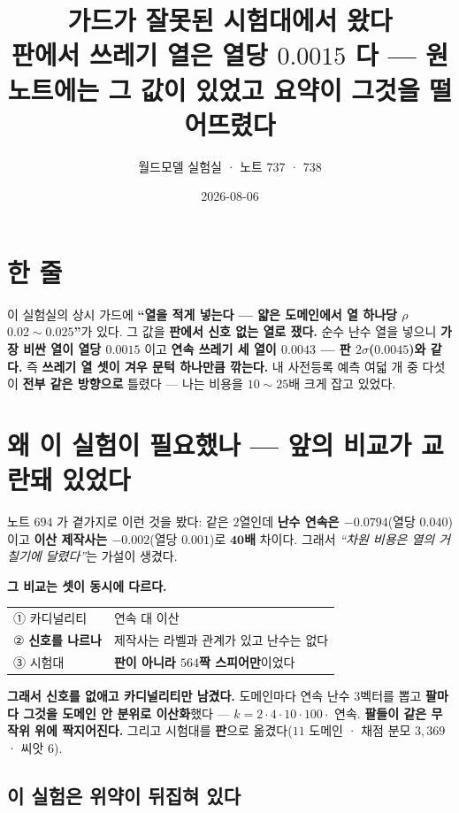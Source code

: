 \documentclass[10pt,a4paper]{article}
\title{\bfseries 가드가 잘못된 시험대에서 왔다\\[2pt]
\large 판에서 쓰레기 열은 열당 $0.0015$ 다 --- 원노트에는 그 값이 있었고 요약이 그것을 떨어뜨렸다}
\author{월드모델 실험실 · 노트 737 · 738}
\date{2026-08-06}
\begin{document}
\maketitle

\section{한 줄}

이 실험실의 상시 가드에 \textbf{``열을 적게 넣는다 --- 얇은 도메인에서 열 하나당
$\rho$ $0.02{\sim}0.025$''}가 있다. 그 값을 \textbf{판에서 신호 없는 열로 쟀다.} 순수 난수 열을
넣으니 \textbf{가장 비싼 열이 열당 $0.0015$} 이고 \textbf{연속 쓰레기 세 열이
$0.0043$ --- 판 $2\sigma$($0.0045$)와 같다.} 즉 \textbf{쓰레기 열 셋이 겨우 문턱
하나만큼 깎는다.} 내 사전등록 예측 여덟 개 중 다섯이 \textbf{전부 같은 방향으로}
틀렸다 --- 나는 비용을 $10{\sim}25$배 크게 잡고 있었다.

\section{왜 이 실험이 필요했나 --- 앞의 비교가 교란돼 있었다}

노트 $694$ 가 곁가지로 이런 것을 봤다: 같은 $2$열인데 \textbf{난수 연속은
$-0.0794$}(열당 $0.040$)이고 \textbf{이산 제작사는 $-0.002$}(열당 $0.001$)로
$\mathbf{40}$\textbf{배} 차이다. 그래서 \emph{``차원 비용은 열의 거칠기에
달렸다''}는 가설이 생겼다.

\textbf{그 비교는 셋이 동시에 다르다.}

\begin{center}
\begin{tabular}{ll}
\toprule
① 카디널리티 & 연속 대 이산 \\
② \textbf{신호를 나르나} & 제작사는 라벨과 관계가 있고 난수는 없다 \\
③ 시험대 & \textbf{판이 아니라 $564$짝 스피어만}이었다 \\
\bottomrule
\end{tabular}
\end{center}

\textbf{그래서 신호를 없애고 카디널리티만 남겼다.} 도메인마다 연속 난수 $3$벡터를
뽑고 \textbf{팔마다 그것을 도메인 안 분위로 이산화}했다 --- $k = 2 \cdot 4 \cdot 10
\cdot 100 \cdot$ 연속. \textbf{팔들이 같은 무작위 위에 짝지어진다.} 그리고 시험대를
\textbf{판}으로 옮겼다($11$ 도메인 · 채점 분모 $3{,}369$ · 씨앗 $6$).

\subsection*{이 실험은 위약이 뒤집혀 있다}
\end{document}
